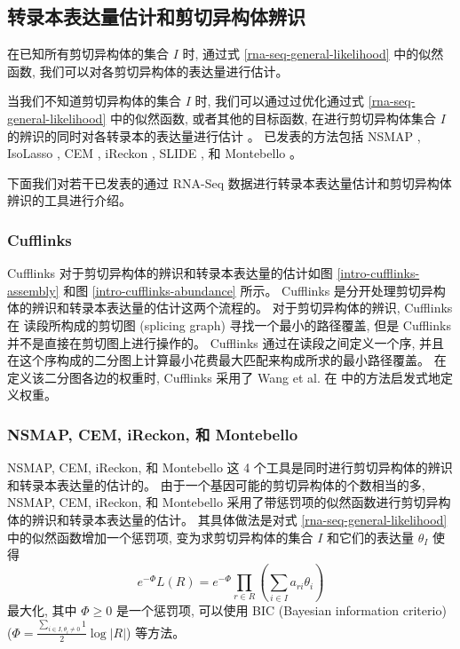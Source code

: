 \subsection{转录本表达量估计和剪切异构体辨识}
在已知所有剪切异构体的集合 $I$ 时, 通过式 \eqref{rna-seq-general-likelihood} 中的似然函数, 
我们可以对各剪切异构体的表达量进行估计。 

当我们不知道剪切异构体的集合 $I$ 时, 
我们可以通过过优化通过式 \eqref{rna-seq-general-likelihood} 中的似然函数, 
或者其他的目标函数, 在进行剪切异构体集合 $I$ 的辨识的同时对各转录本的表达量进行估计 
\cite{xing2006expectation}。 
已发表的方法包括 NSMAP \cite{nsmap.21575225}, 
IsoLasso \cite{isolasso.recomb}, 
CEM \cite{Li15112012}, 
iReckon \cite{Mezlini29112012}, 
SLIDE \cite{Li13122011}, 和 
Montebello \cite{Hiller.Montebello}。

下面我们对若干已发表的通过 RNA-Seq 数据进行转录本表达量估计和剪切异构体辨识的工具进行介绍。 

\subsubsection{Cufflinks}
Cufflinks 对于剪切异构体的辨识和转录本表达量的估计如图 \ref{intro-cufflinks-assembly} 
和图 \ref{intro-cufflinks-abundance} 所示。 
Cufflinks 是分开处理剪切异构体的辨识和转录本表达量的估计这两个流程的。 
对于剪切异构体的辨识, Cufflinks 在 读段所构成的剪切图 
(splicing graph) \cite{Heber01072002} 寻找一个最小的路径覆盖, 
但是 Cufflinks 并不是直接在剪切图上进行操作的。 
Cufflinks 通过在读段之间定义一个序, 
并且在这个序构成的二分图上计算最小花费最大匹配来构成所求的最小路径覆盖。 
在定义该二分图各边的权重时, Cufflinks 采用了 Wang et al. 在  
中的方法启发式地定义权重。

\subsubsection{NSMAP, CEM, iReckon, 和 Montebello}
\label{intro-nsmap-cem-ireckon-montebllo}

NSMAP, CEM, iReckon, 和 Montebello 这 4 个工具是同时进行剪切异构体的辨识和转录本表达量的估计的。 
由于一个基因可能的剪切异构体的个数相当的多, NSMAP, CEM, iReckon, 和 Montebello 
采用了带惩罚项的似然函数进行剪切异构体的辨识和转录本表达量的估计。 
其具体做法是对式 \eqref{rna-seq-general-likelihood} 中的似然函数增加一个惩罚项, 
变为求剪切异构体的集合 $I$ 和它们的表达量 $\theta_I$ 使得
\begin{equation}
e^{-\Phi} L(R) = 
e^{-\Phi}\prod_{r \in R} (\sum_{i \in I} a_{ri} \theta_i)
\end{equation}
最大化, 其中 $\Phi \geq 0$ 是一个惩罚项, 可以使用 BIC (Bayesian information criterio) \cite{BIC.Schwarz_1978}  
($\Phi = \frac{\sum_{i \in I, \theta_i\neq 0} 1}{2} \log |R|$) 等方法。

